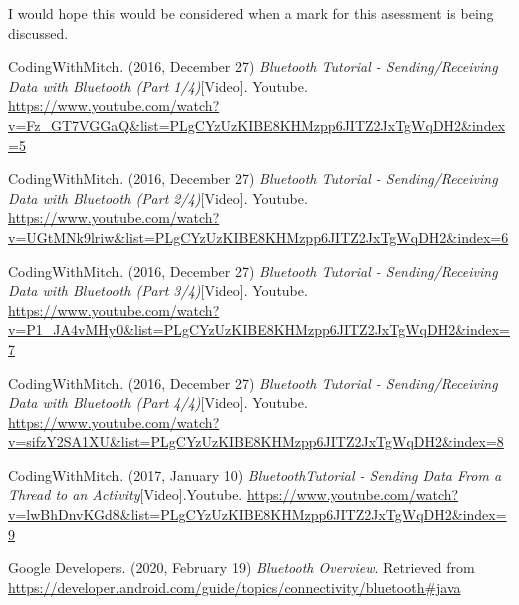 \documentclass[12pt,a4paper]{article}
\begin{document}
    I would hope this would be considered when a mark for this asessment is being discussed.
    \newpage
    
    \begin{thebibliography}{9}
    
    
    CodingWithMitch. (2016, December 27)
    \textit{Bluetooth Tutorial - Sending/Receiving Data with Bluetooth (Part 1/4)}[Video].
    Youtube.
    \url{https://www.youtube.com/watch?v=Fz_GT7VGGaQ&list=PLgCYzUzKIBE8KHMzpp6JITZ2JxTgWqDH2&index=5}
    
    CodingWithMitch. (2016, December 27)
    \textit{Bluetooth Tutorial - Sending/Receiving Data with Bluetooth (Part 2/4)}[Video].
    Youtube.
    \url{https://www.youtube.com/watch?v=UGtMNk9lriw&list=PLgCYzUzKIBE8KHMzpp6JITZ2JxTgWqDH2&index=6}
    
    CodingWithMitch. (2016, December 27)
    \textit{Bluetooth Tutorial - Sending/Receiving Data with Bluetooth (Part 3/4)}[Video].
    Youtube.
    \url{https://www.youtube.com/watch?v=P1_JA4vMHy0&list=PLgCYzUzKIBE8KHMzpp6JITZ2JxTgWqDH2&index=7}
    
    CodingWithMitch. (2016, December 27)
    \textit{Bluetooth Tutorial - Sending/Receiving Data with Bluetooth (Part 4/4)}[Video].
    Youtube.
    \url{https://www.youtube.com/watch?v=sifzY2SA1XU&list=PLgCYzUzKIBE8KHMzpp6JITZ2JxTgWqDH2&index=8}
    
    CodingWithMitch. (2017, January 10)
    \textit{BluetoothTutorial - Sending Data From a Thread to an Activity}[Video].Youtube.
    \url{https://www.youtube.com/watch?v=lwBhDnvKGd8&list=PLgCYzUzKIBE8KHMzpp6JITZ2JxTgWqDH2&index=9}
    
    Google Developers. (2020, February 19)
    \textit{Bluetooth Overview}.
    Retrieved from
    \url{https://developer.android.com/guide/topics/connectivity/bluetooth#java}
    
    \end{thebibliography}
    \newpage
    
    \listoffigures
    \newpage

    \lstlistoflistings
    \newpage
\end{document}
